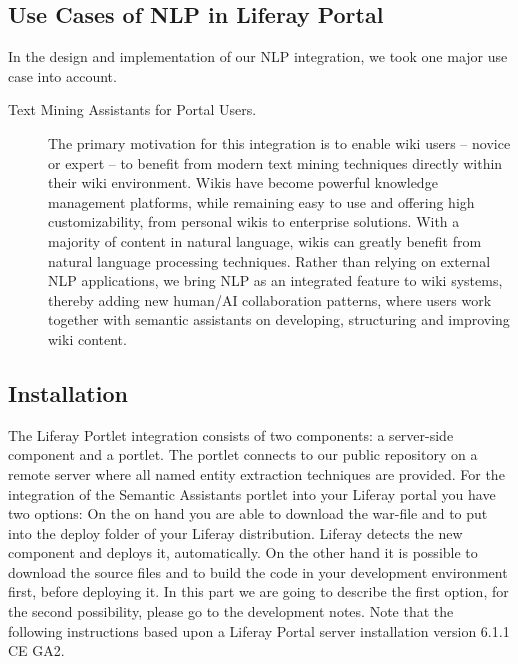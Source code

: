 \subsection{Use Cases of NLP in Liferay Portal}
In the design and implementation of our NLP integration, we took one major use case into account.

\begin{description}
\item[Text Mining Assistants for Portal Users.] 


The primary motivation for this integration is to enable wiki users -- novice or expert -- to benefit from modern text mining techniques directly within their wiki environment. Wikis have become powerful knowledge management platforms, while remaining easy to use and offering high customizability, from personal wikis to enterprise solutions. With a majority of content in natural language, wikis can greatly benefit from natural language processing techniques. Rather than relying on external NLP applications, we bring NLP as an integrated feature to wiki systems, thereby adding new human/AI collaboration patterns, where users work together with semantic assistants on developing, structuring and improving wiki content.

\end{description}

\noindent

\subsection{Installation}
The Liferay Portlet integration consists of two components: a server-side component and a portlet. The portlet connects to our public repository on a remote server where all named entity extraction techniques are provided. For the integration of the Semantic Assistants portlet into your Liferay portal you have two options: On the on hand you are able to download the war-file and to put into the deploy folder of your Liferay distribution. Liferay detects the new component and deploys it, automatically. On the other hand it is possible to download the source files and to build the code in your development environment first, before deploying it. In this part we are going to describe the first option, for the second possibility, please go to the development notes. Note that the following instructions based upon a Liferay Portal server installation version 6.1.1 CE GA2. 



